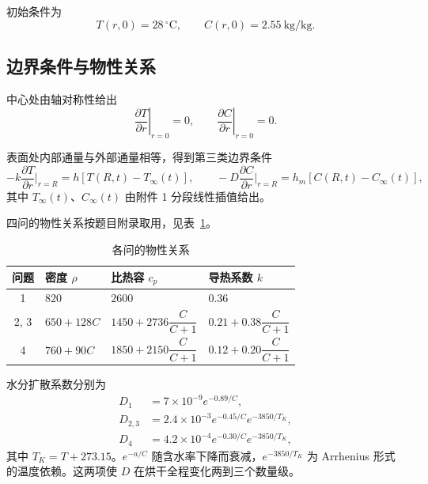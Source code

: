 \documentclass[12pt,a4paper]{ctexart}
\begin{document}
初始条件为
\begin{equation}
T(r,0)=28\,^\circ\text{C},\qquad C(r,0)=2.55\ \text{kg/kg}.
\end{equation}

\subsection{边界条件与物性关系}

中心处由轴对称性给出
\begin{equation}
\left.\frac{\partial T}{\partial r}\right|_{r=0}=0,\qquad
\left.\frac{\partial C}{\partial r}\right|_{r=0}=0 .
\end{equation}

表面处内部通量与外部通量相等，得到第三类边界条件
\begin{equation}
-k\frac{\partial T}{\partial r}\bigg|_{r=R}=h\left[T(R,t)-T_\infty(t)\right],\qquad
-D\frac{\partial C}{\partial r}\bigg|_{r=R}=h_m\left[C(R,t)-C_\infty(t)\right],
\end{equation}
其中 $T_\infty(t)$、$C_\infty(t)$ 由附件 1 分段线性插值给出。

四问的物性关系按题目附录取用，见表~\ref{tab:props}。

\begin{table}[htbp]
\centering
\caption{各问的物性关系}
\label{tab:props}
\begin{tabular}{clll}
\toprule
问题 & 密度 $\rho$ & 比热容 $c_p$ & 导热系数 $k$ \\
\midrule
1 & $820$ & $2600$ & $0.36$ \\
2, 3 & $650+128C$ & $1450+2736\dfrac{C}{C+1}$ & $0.21+0.38\dfrac{C}{C+1}$ \\
4 & $760+90C$ & $1850+2150\dfrac{C}{C+1}$ & $0.12+0.20\dfrac{C}{C+1}$ \\
\bottomrule
\end{tabular}
\end{table}

水分扩散系数分别为
\begin{equation}
\begin{aligned}
D_1 &= 7\times10^{-9}e^{-0.89/C},\\
D_{2,3} &= 2.4\times10^{-3}e^{-0.45/C}e^{-3850/T_K},\\
D_4 &= 4.2\times10^{-4}e^{-0.30/C}e^{-3850/T_K},
\end{aligned}
\end{equation}
其中 $T_K=T+273.15$。$e^{-a/C}$ 随含水率下降而衰减，$e^{-3850/T_K}$ 为 Arrhenius 形式的温度依赖。这两项使 $D$ 在烘干全程变化两到三个数量级。
\end{document}
